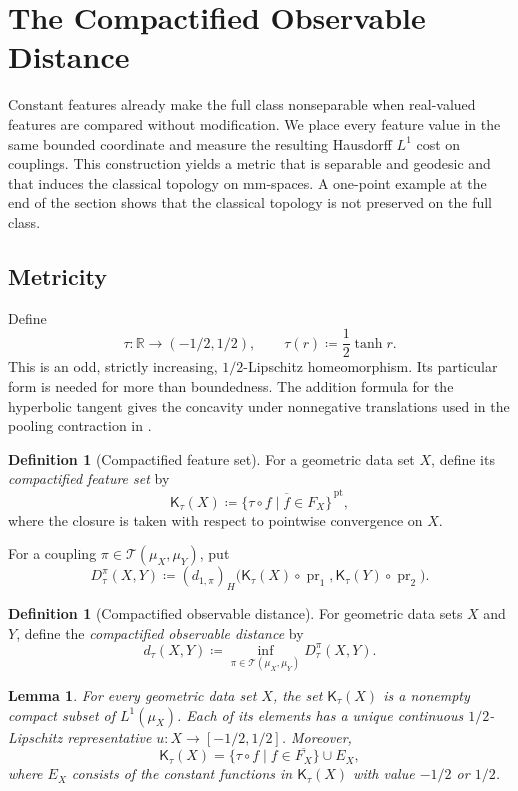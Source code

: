 \documentclass[11pt]{amsart}
\theoremstyle{plain}
\newtheorem{lemma}[theorem]{Lemma}
\theoremstyle{definition}
\newtheorem{definition}[theorem]{Definition}
\theoremstyle{remark}
\newcommand{\R}{\mathbb R}
\newcommand{\T}{\mathcal T}
\newcommand{\Kc}{\mathsf K}
\newcommand{\dtau}{d_{\tau}}
\DeclareMathOperator{\pr}{pr}
\begin{document}
\section{The Compactified Observable Distance}
\label{sec:bounded-observable-distance}

Constant features already make the full class nonseparable when real-valued features are compared without modification. We place every feature value in the same bounded coordinate and measure the resulting Hausdorff $L^1$ cost on couplings. This construction yields a metric that is separable and geodesic and that induces the classical topology on mm-spaces. A one-point example at the end of the section shows that the classical topology is not preserved on the full class.

\subsection{Metricity}
\label{subsec:dtau-metricity}

Define
\[
\tau\colon\R\longrightarrow(-1/2,1/2),\qquad
\tau(r)\coloneqq\frac12\tanh r.
\]
This is an odd, strictly increasing, $1/2$-Lipschitz homeomorphism. Its particular form is needed for more than boundedness. The addition formula for the hyperbolic tangent gives the concavity under nonnegative translations used in the pooling contraction in .

\begin{definition}[Compactified feature set]
\label{def:compactified-feature-set}
For a geometric data set $X$, define its \emph{compactified feature set} by
\[
\Kc_\tau(X)\coloneqq
\overline{\{\tau\circ f\mid f\in F_X\}}^{\,\mathrm{pt}},
\]
where the closure is taken with respect to pointwise convergence on $X$.
\end{definition}

For a coupling $\pi\in\T(\mu_X,\mu_Y)$, put
\[
D_\tau^\pi(X,Y)\coloneqq(d_{1,\pi})_H
\bigl(\Kc_\tau(X)\circ\pr_1,\Kc_\tau(Y)\circ\pr_2\bigr).
\]

\begin{definition}[Compactified observable distance]
\label{def:dtau}
For geometric data sets $X$ and $Y$, define the \emph{compactified observable distance} by
\[
\dtau(X,Y)\coloneqq\inf_{\pi\in\T(\mu_X,\mu_Y)}D_\tau^\pi(X,Y).
\]
\end{definition}

\begin{lemma}
\label{lem:feature-compactness}
For every geometric data set $X$, the set $\Kc_\tau(X)$ is a nonempty compact subset of $L^1(\mu_X)$. Each of its elements has a unique continuous $1/2$-Lipschitz representative $u\colon X\to[-1/2,1/2]$. Moreover,
\[
\Kc_\tau(X)=\{\tau\circ f\mid f\in\overline{F_X}\}\cup E_X,
\]
where $E_X$ consists of the constant functions in $\Kc_\tau(X)$ with value $-1/2$ or $1/2$.
\end{lemma}
\end{document}
